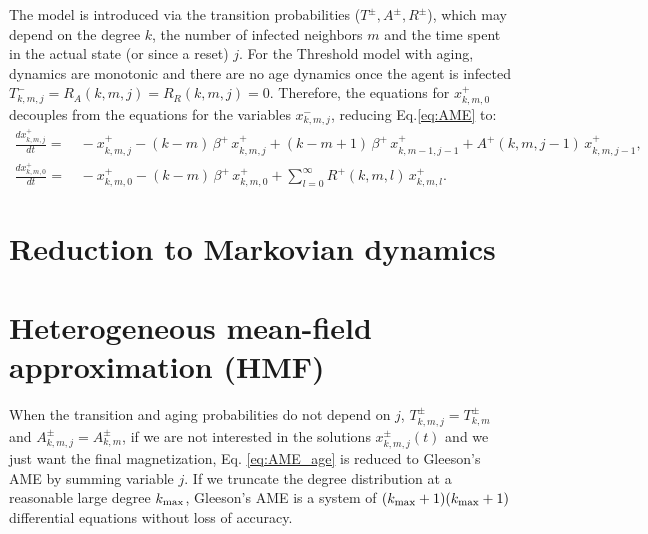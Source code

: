     The model is introduced via the transition probabilities ($T^{\pm}, A^{\pm}, R^{\pm}$), which may depend on the degree $k$, the number of infected neighbors $m$ and the time spent in the actual state (or since a reset) $j$. For the Threshold model with aging, dynamics are monotonic and there are no age dynamics once the agent is infected $T^{-}_{k,m,j} = R_A (k,m,j) = R_R(k,m,j) = 0$. Therefore, the equations for $x^{+}_{k,m,0}$  decouples from the equations for the variables $x^{-}_{k,m,j}$, reducing Eq.\eqref{eq:AME} to:
    \begin{align}
    \label{eq:AME_Threshold_AP}
        \frac{d x^{+}_{k,m,j}}{dt}  = & \, - x^{+}_{k,m,j} - (k - m)\, \beta^{+} \,   x^{+}_{k,m,j} + (k-m+1) \, \beta^{+} \,  x^{+}_{k,m-1,j-1} + A^{+} (k,m,j-1)\,  x^{+}_{k,m,j-1},  \\
        \frac{d x^{+}_{k,m,0}}{dt}  = & \,  - x^{+}_{k,m,0} - (k - m)\, \beta^{+} \,  x^{+}_{k,m,0} + \sum_{l = 0}^{\infty} R^{+} (k,m,l) \, x^{+}_{k,m,l} . \nonumber
    \end{align}

    \section{\label{sec:Reduction to Markovian dynamics}  Reduction to Markovian dynamics}

    \section{\label{sec:Heterogeneous mean-field approximation}  Heterogeneous mean-field approximation (HMF)}

    When the transition and aging probabilities do not depend on $j$, $T^{\pm}_{k,m,j} = T^{\pm}_{k,m}$ and $A^{\pm}_{k,m,j} = A^{\pm}_{k,m}$, if we are not interested in the solutions $x^{\pm}_{k,m,j} (t)$ and we just want the final magnetization, Eq. \ref{eq:AME_age} is reduced to Gleeson's AME \cite{gleeson-2013} by summing variable $j$. If we truncate the degree distribution at a reasonable large degree $k_{\rm max}$, Gleeson's AME is a system of $(k_{\rm max}+1)(k_{\rm max}+1)$ differential equations without loss of accuracy.

